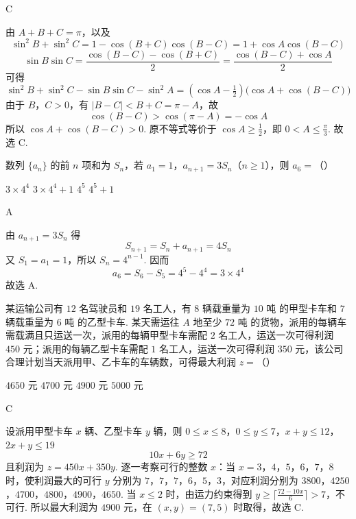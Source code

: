 \begin{answer}
C
\end{answer}

\begin{solution}
由 \(A+B+C=\pi\)，以及
\[
\sin^2B+\sin^2C=1-\cos(B+C)\cos(B-C)=1+\cos A\cos(B-C)
\]
\[
\sin B\sin C=\frac{\cos(B-C)-\cos(B+C)}{2}=\frac{\cos(B-C)+\cos A}{2}
\]
可得
\[
\sin^2B+\sin^2C-\sin B\sin C-\sin^2A
=(\cos A-\tfrac12)\bigl(\cos A+\cos(B-C)\bigr)
\]
由于 \(B\)，\(C>0\)，有 \(|B-C|<B+C=\pi-A\)，故
\[
\cos(B-C)>\cos(\pi-A)=-\cos A
\]
所以 \(\cos A+\cos(B-C)>0\). 原不等式等价于 \(\cos A\geqslant\frac12\)，即 \(0<A\leqslant\frac{\pi}{3}\). 故选 C.
\end{solution}

\begin{problem}
数列 \(\{a_n\}\) 的前 \(n\) 项和为 \(S_n\)，若 \(a_1 = 1\)，\(a_{n+1} = 3S_n\)（\(n \geqslant 1\)），则 \(a_6 =\)（\quad）

\choices
    {\(3 \times 4^4\)}
    {\(3 \times 4^4 + 1\)}
    {\(4^5\)}
    {\(4^5 + 1\)}
\end{problem}

\begin{answer}
A
\end{answer}

\begin{solution}
由 \(a_{n+1}=3S_n\) 得
\[
S_{n+1}=S_n+a_{n+1}=4S_n
\]
又 \(S_1=a_1=1\)，所以 \(S_n=4^{n-1}\). 因而
\[
a_6=S_6-S_5=4^5-4^4=3\times4^4
\]
故选 A.
\end{solution}

\begin{problem}
某运输公司有 \(12\) 名驾驶员和 \(19\) 名工人，有 \(8\) 辆载重量为 \(10\text{ 吨}\) 的甲型卡车和 \(7\) 辆载重量为 \(6\text{ 吨}\) 的乙型卡车. 某天需运往 \(A\) 地至少 \(72\text{ 吨}\) 的货物，派用的每辆车需载满且只运送一次，派用的每辆甲型卡车需配 \(2\) 名工人，运送一次可得利润 \(450\text{ 元}\)；派用的每辆乙型卡车需配 \(1\) 名工人，运送一次可得利润 \(350\text{ 元}\)，该公司合理计划当天派用甲、乙卡车的车辆数，可得最大利润 \(z =\)（\quad）

\choices
    {\(4650\text{ 元}\)}
    {\(4700\text{ 元}\)}
    {\(4900\text{ 元}\)}
    {\(5000\text{ 元}\)}
\end{problem}

\begin{answer}
C
\end{answer}

\begin{solution}
设派用甲型卡车 \(x\) 辆、乙型卡车 \(y\) 辆，则
\(0\leqslant x\leqslant8\)，\(0\leqslant y\leqslant7\)，\(x+y\leqslant12\)，\(2x+y\leqslant19\)
\[
10x+6y\geqslant72
\]
且利润为 \(z=450x+350y\). 逐一考察可行的整数 \(x\)：当 \(x=3\)，\(4\)，\(5\)，\(6\)，\(7\)，\(8\) 时，使利润最大的可行 \(y\) 分别为 \(7\)，\(7\)，\(7\)，\(6\)，\(5\)，\(3\)，对应利润分别为
\(3800\)，\(4250\)，\(4700\)，\(4800\)，\(4900\)，\(4650\).
当 \(x\leqslant2\) 时，由运力约束得到 \(y\geqslant\lceil\frac{72-10x}{6}\rceil>7\)，不可行. 所以最大利润为 \(4900\text{ 元}\)，在 \((x,y)=(7,5)\) 时取得，故选 C.
\end{solution}

